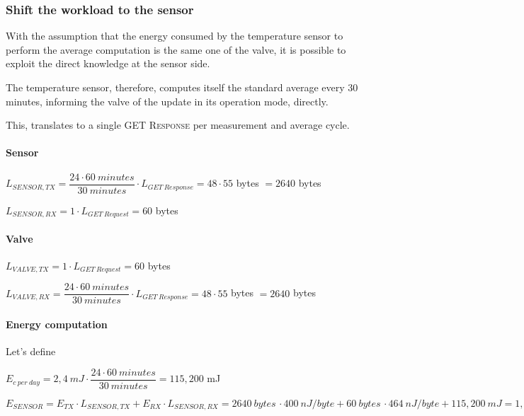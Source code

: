 \documentclass[a4paper,11pt]{article} %
\begin{document}
    \subsubsection{Shift the workload to the sensor}

    With the assumption that the energy consumed by the temperature sensor to perform the average computation is the same one of the valve, it is possible to exploit the direct knowledge at the sensor side.

    The temperature sensor, therefore, computes itself the standard average every 30 minutes, informing the valve of the update in its operation mode, directly.

    This, translates to a single \textsc{GET Response} per measurement and average cycle.

    \paragraph{Sensor}

    $L_{SENSOR, TX} = \dfrac{24 \cdot 60\ minutes}{30\ minutes} \cdot L_{GET\ Response} = 48 \cdot 55$ bytes $ = 2640$ bytes

    \medskip

    $L_{SENSOR, RX} = 1 \cdot L_{GET\ Request} = 60$ bytes

    \paragraph{Valve}

    $L_{VALVE, TX} = 1 \cdot L_{GET\ Request} = 60$ bytes

    \medskip

    $L_{VALVE, RX} = \dfrac{24 \cdot 60\ minutes}{30\ minutes} \cdot L_{GET\ Response} = 48 \cdot 55$ bytes $ = 2640$ bytes

    \paragraph{Energy computation}

    Let's define

    \bigskip

    $E_{c \ per \ day} = 2,4\ mJ \cdot \dfrac{24 \cdot 60\ minutes}{30\ minutes} = 115,200$ mJ

    \bigskip

    $E_{SENSOR} = E_{TX} \cdot L_{SENSOR, TX} + E_{RX} \cdot L_{SENSOR, RX} = 2640\ bytes \, \cdot 400\ nJ/byte + 60\ bytes \, \cdot 464\ nJ/byte + 115,200\ mJ = 1,056\ mJ\ + 27,840\ \mu J + 115,200\ mJ = 116,284\ mJ$
\end{document}
